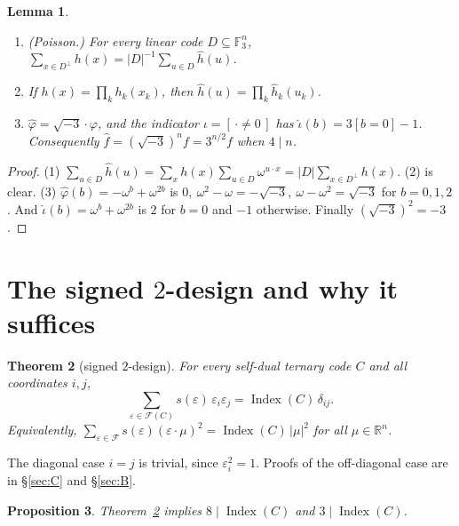 \documentclass[11pt]{amsart}
\newtheorem{theorem}{Theorem}[section]
\newtheorem{lemma}[theorem]{Lemma}
\newtheorem{proposition}[theorem]{Proposition}
\theoremstyle{definition}
\newcommand{\F}{\mathbb{F}_3}
\newcommand{\Index}{\operatorname{Index}}
\newcommand{\cF}{\mathcal{F}}
\newcommand{\isq}{\sqrt{-3}}
\begin{document}
\begin{lemma}\label{lem:fourier}
\begin{enumerate}
\item \emph{(Poisson.)} For every linear code $D\subseteq\F^n$,
  $\displaystyle\sum_{x\in D^\perp}h(x)=|D|^{-1}\sum_{u\in D}\hat h(u)$.
\item If $h(x)=\prod_kh_k(x_k)$, then $\hat h(u)=\prod_k\hat h_k(u_k)$.
\item $\hat\varphi=\isq\cdot\varphi$, and the indicator $\iota=[\,\cdot\ne0\,]$ has
  $\hat\iota(b)=3[b=0]-1$. Consequently $\hat f=(\isq)^nf=3^{n/2}f$ when $4\mid n$.
\end{enumerate}
\end{lemma}

\begin{proof}
(1) $\sum_{u\in D}\hat h(u)=\sum_xh(x)\sum_{u\in D}\omega^{u\cdot x}=|D|\sum_{x\in D^\perp}h(x)$.
(2) is clear. (3) $\hat\varphi(b)=-\omega^b+\omega^{2b}$ is $0,\ \omega^2-\omega=-\isq,\ \omega-\omega^2=\isq$
for $b=0,1,2$. And $\hat\iota(b)=\omega^b+\omega^{2b}$ is $2$ for $b=0$ and $-1$ otherwise.
Finally $(\isq)^2=-3$.
\end{proof}

\section{The signed \texorpdfstring{$2$}{2}-design and why it suffices}\label{sec:design}

\begin{theorem}[signed $2$-design]\label{thm:design}
For every self-dual ternary code $C$ and all coordinates $i,j$,
\[
  \sum_{\varepsilon\in\cF(C)}s(\varepsilon)\,\varepsilon_i\varepsilon_j=\Index(C)\,\delta_{ij}.
\]
Equivalently, $\sum_{\varepsilon\in\cF}s(\varepsilon)(\varepsilon\cdot\mu)^2=\Index(C)\,|\mu|^2$ for
all $\mu\in\mathbb R^n$.
\end{theorem}

The diagonal case $i=j$ is trivial, since $\varepsilon_i^2=1$. Proofs of the off-diagonal case are
in \S\ref{sec:C} and \S\ref{sec:B}.

\begin{proposition}\label{prop:design-suffices}
Theorem~\ref{thm:design} implies $8\mid\Index(C)$ and $3\mid\Index(C)$.
\end{proposition}
\end{document}

